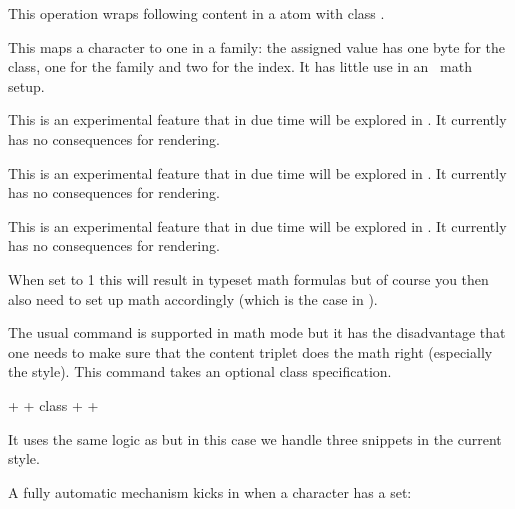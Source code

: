 This operation wraps following content in a atom with class .

\stopoldprimitive

\startoldprimitive[title={\prm {mathcode}}][obsolete=yes]

This maps a character to one in a family: the assigned value has one byte for the
class, one for the family and two for the index. It has little use in an
\OPENTYPE\ math setup.

\stopoldprimitive

\startnewprimitive[title={\prm {mathdictgroup}}]

This is an experimental feature that in due time will be explored in \CONTEXT. It
currently has no consequences for rendering.

\stopnewprimitive

\startnewprimitive[title={\prm {mathdictionary}}]

This is an experimental feature that in due time will be explored in \CONTEXT. It
currently has no consequences for rendering.

\stopnewprimitive

\startnewprimitive[title={\prm {mathdictproperties}}]

This is an experimental feature that in due time will be explored in \CONTEXT. It
currently has no consequences for rendering.

\stopnewprimitive

\startnewprimitive[title={\prm {mathdirection}}]

When set to 1 this will result in  typeset math formulas but of course
you then also need to set up math accordingly (which is the case in \CONTEXT).

\stopnewprimitive

\startnewprimitive[title={\prm {mathdiscretionary}}]

The usual  command is supported in math mode but it has the
disadvantage that one needs to make sure that the content triplet does the math
right (especially the style). This command takes an optional class specification.

\starttyping
\mathdiscretionary                       {+} {+} {+}
\mathdiscretionary class \mathbinarycode {+} {+} {+}
\stoptyping

It uses the same logic as  but in this case we handle three
snippets in the current style.

A fully automatic mechanism kicks in when a character has a  set:

